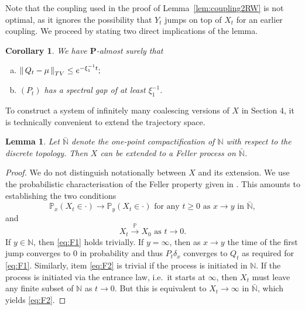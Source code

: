\documentclass[11pt,a4paper]{scrartcl}
\numberwithin{equation}{section}
\theoremstyle{plain}
\newtheorem{lemma}[theorem]{Lemma}
\newtheorem{corollary}[theorem]{Corollary}
\theoremstyle{definition}
\theoremstyle{remark}
\newcommand{\bN}{\ensuremath{\mathbb{N}}}
\newcommand{\bP}{\ensuremath{\mathbb{P}}}
\newcommand{\norm}[1]{\left\Vert \, #1 \, \right\Vert}
\newcommand{\bfP}{\mathbf{P}}
\begin{document}
Note that the coupling used in the proof of Lemma~\ref{lem:coupling2RW} is not optimal, as it ignores the possibility that $Y_t$ jumps on top of $X_t$ for an earlier coupling. We proceed by stating two direct implications of the lemma.
\begin{corollary}\label{Cor:spec}
We have $\bfP$-almost surely that 
\begin{enumerate}[(a)]
\item $\norm{Q_t-\mu}_{\textup{TV}}\leq e^{-\xi_1^{-1}t};$
\item $(P_t)$ has a spectral gap of at least $\xi_1^{-1}$.
\end{enumerate}
\end{corollary}

To construct a system of infinitely many coalescing versions of $X$ in Section 4, it is technically convenient to extend the trajectory space.
\begin{lemma}\label{lem:Feller}
Let $\bar{\bN}$ denote the one-point compactification of $\bN$ with respect to the discrete topology. Then $X$ can be extended to a Feller process on $\bar{\bN}$.
\end{lemma}
\begin{proof}
We do not distinguish notationally between $X$ and its extension. We use the probabilistic characterisation of the Feller property given in \cite[Lemma 17.3]{KallenbergFM}. This amounts to establishing the two conditions
\begin{equation}\label{eq:F1}
\bP_x(X_t \in \cdot)\to \bP_y(X_t \in \cdot) \text{ for any }t\geq 0 \text{ as }x\to y \text{ in }\bar{\bN},
\end{equation}
and
\begin{equation}\label{eq:F2}
X_t\overset{\bP}{\to}X_0 \text{ as }t\to 0.
\end{equation}
If $y\in \bN$, then \eqref{eq:F1} holds trivially. If $y=\infty$, then as $x\to y$ the time of the first jump converges to $0$ in probability and thus $P_t\delta_x$ converges to $Q_t$ as required for \eqref{eq:F1}. Similarly, item \eqref{eq:F2} is trivial if the process is initiated in $\bN$. If the process is initiated via the entrance law, i.e.\ it starts at $\infty$, then $X_t$ must leave any finite subset of $\bN$ as $t\to 0$. But this is equivalent to $X_t\to\infty$ in $\bar{\bN}$, which yields \eqref{eq:F2}.
\end{proof}

\end{document}

